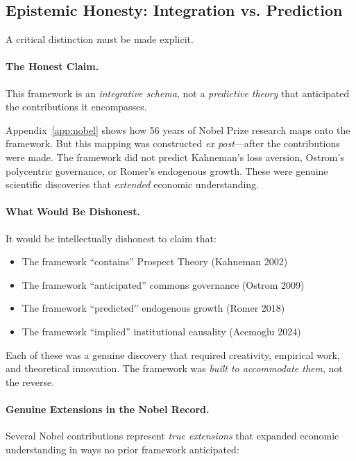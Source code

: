 \subsection{Epistemic Honesty: Integration vs. Prediction}

A critical distinction must be made explicit.

\paragraph{The Honest Claim.}
This framework is an \emph{integrative schema}, not a \emph{predictive theory}
that anticipated the contributions it encompasses.

Appendix~\ref{app:nobel} shows how 56 years of Nobel Prize research maps onto
the framework. But this mapping was constructed \emph{ex post}---after the
contributions were made. The framework did not predict Kahneman's loss aversion,
Ostrom's polycentric governance, or Romer's endogenous growth. These were
genuine scientific discoveries that \emph{extended} economic understanding.

\paragraph{What Would Be Dishonest.}
It would be intellectually dishonest to claim that:
\begin{itemize}
  \item The framework ``contains'' Prospect Theory (Kahneman 2002)
  \item The framework ``anticipated'' commons governance (Ostrom 2009)
  \item The framework ``predicted'' endogenous growth (Romer 2018)
  \item The framework ``implied'' institutional causality (Acemoglu 2024)
\end{itemize}

Each of these was a genuine discovery that required creativity, empirical work,
and theoretical innovation. The framework was \emph{built to accommodate them},
not the reverse.

\paragraph{Genuine Extensions in the Nobel Record.}
Several Nobel contributions represent \emph{true extensions} that expanded
economic understanding in ways no prior framework anticipated:

